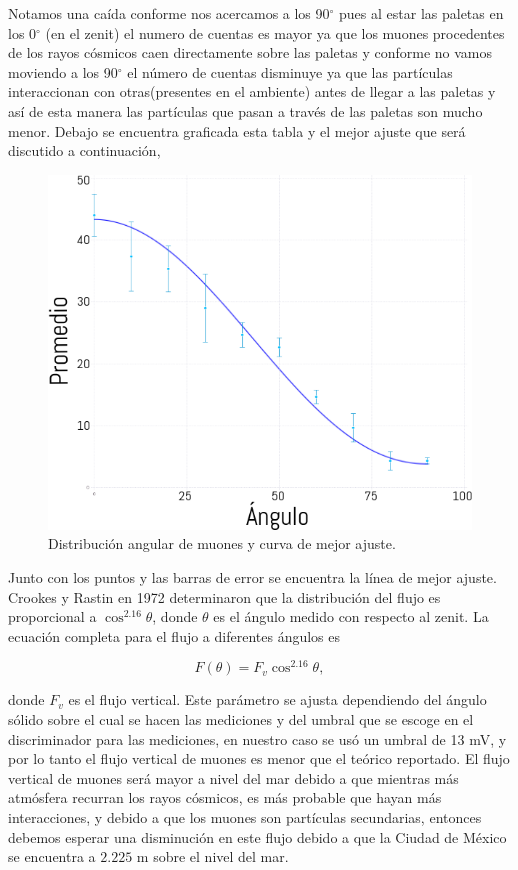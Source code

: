 \documentclass[a4paper,10pt]{article}
\numberwithin{equation}{section}
\begin{document}
Notamos una caída conforme nos acercamos a los 90$^\circ$  pues al estar las paletas en 
los 0$^\circ$ (en el zenit) el numero de cuentas es mayor ya que los muones procedentes 
de los rayos cósmicos caen directamente sobre las  paletas y conforme no vamos moviendo  
a los 90$^\circ$  el número de cuentas disminuye  ya que las partículas
interaccionan con otras(presentes en el ambiente) antes de  llegar a las paletas y 
así de esta manera las partículas que pasan a través de las paletas  son mucho menor. 
Debajo se encuentra graficada esta tabla y el mejor ajuste que será discutido a continuación,

\begin{figure}[H]
 \center 
 \includegraphics[scale=0.5]{ajusteAngulos}
 \caption{Distribución angular de muones y curva de mejor ajuste.}
 \label{fig:ajusteAngulos}
\end{figure}

Junto con los puntos y las barras de error se encuentra la línea de mejor ajuste. Crookes 
y Rastin en 1972 \cite{crookes} determinaron que la distribución del flujo es proporcional 
a $\cos^{2.16}{\theta}$, donde $\theta$ es el ángulo medido con respecto al zenit. La 
ecuación completa para el flujo a diferentes ángulos es 

\begin{equation}
 F(\theta) = F_v\cos^{2.16}{\theta},
\end{equation}

donde $F_v$ es el flujo vertical. Este parámetro se ajusta dependiendo del ángulo 
sólido sobre el cual se hacen las mediciones y del umbral que se escoge en el discriminador 
para las mediciones, en nuestro caso se usó un umbral de 13 mV, y por lo tanto el flujo 
vertical de muones es menor que el teórico reportado. El flujo vertical de muones 
será mayor a nivel del mar debido a que mientras más atmósfera recurran los rayos 
cósmicos, es más probable que hayan más interacciones, y debido a que los muones son 
partículas secundarias, entonces debemos esperar una disminución en este flujo debido 
a que la Ciudad de México se encuentra a $2.225$ m sobre el nivel del mar. 
\end{document}
